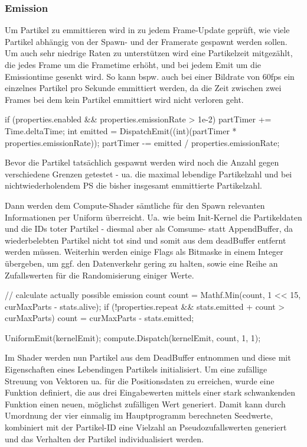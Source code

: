 \subsubsection{Emission}

Um Partikel zu emmittieren wird in zu jedem Frame-Update geprüft, wie viele Partikel abhängig von der Spawn- und der Framerate gespawnt werden sollen. Um auch sehr niedrige Raten zu unterstützen wird eine Partikelzeit mitgezählt, die jedes Frame um die Frametime erhöht, und bei jedem Emit um die Emissiontime gesenkt wird. So kann bspw. auch bei einer Bildrate von 60fps ein einzelnes Partikel pro Sekunde emmittiert werden, da die Zeit zwischen zwei Frames bei dem kein Partikel emmittiert wird nicht verloren geht.

\begin{csh}[caption=Controller Emission]
if (properties.enabled && properties.emissionRate > 1e-2)
{
    partTimer += Time.deltaTime;
    int emitted = DispatchEmit((int)(partTimer * properties.emissionRate));
    partTimer -= emitted / properties.emissionRate;
}
\end{csh}

Bevor die Partikel tatsächlich gespawnt werden wird noch die Anzahl gegen verschiedene Grenzen getestet - ua. die maximal lebendige Partikelzahl und bei nichtwiederholendem PS die bisher insgesamt emmittierte Partikelzahl.

Dann werden dem Compute-Shader sämtliche für den Spawn relevanten Informationen per Uniform überreicht. Ua. wie beim Init-Kernel die Partikeldaten und die IDs toter Partikel - diesmal aber als Comsume- statt AppendBuffer, da wiederbelebten Partikel nicht tot sind und somit aus dem deadBuffer entfernt werden müssen. Weiterhin werden einige Flags als Bitmaske in einem Integer übergeben, um ggf. den Datenverkehr gering zu halten, sowie eine Reihe an Zufallswerten für die Randomisierung einiger Werte.

\begin{csh}[caption=Controller Emission Dispatch]
// calculate actually possible emission count
count = Mathf.Min(count, 1 << 15, curMaxParts - stats.alive);
if (!properties.repeat && stats.emitted + count > curMaxParts)
    count = curMaxParts - stats.emitted;

UniformEmit(kernelEmit);
compute.Dispatch(kernelEmit, count, 1, 1);
\end{csh}

Im Shader werden nun Partikel aus dem DeadBuffer entnommen und diese mit Eigenschaften eines Lebendingen Partikels initialisiert. Um eine zufällige Streuung von Vektoren ua. für die Positionsdaten zu erreichen, wurde eine Funktion definiert, die aus drei Eingabewerten mittels einer stark schwankenden Funktion einen neuen, möglichst zufälligen Wert generiert. Damit kann durch Umordnung der vier einmalig im Hauptprogramm berechneten Seedwerte, kombiniert mit der Partikel-ID eine Vielzahl an Pseudozufallswerten generiert und das Verhalten der Partikel individualisiert werden.


